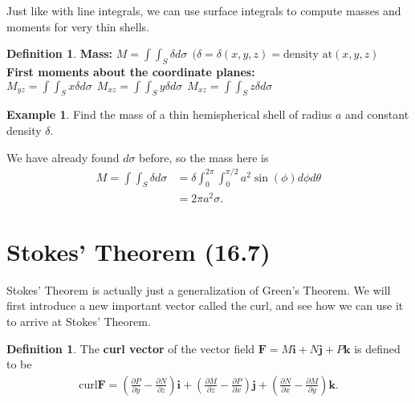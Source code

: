 \documentclass[12pt, letter]{article}
\theoremstyle{plain}
\numberwithin{theorem}{section}
\theoremstyle{definition}
\newtheorem{definition}[theorem]{Definition}
\newtheorem{example}[theorem]{Example}
\begin{document}
\bigskip

\hrulefill

\bigskip

Just like with line integrals, we can use surface integrals to compute masses and moments for very thin shells.

\bigskip

\begin{definition}
\textbf{Mass:} $M = \int\int_S \delta d\sigma \ \ (\delta = \delta(x,y,z) = \text{density at} (x,y,z)$\\
\textbf{First moments about the coordinate planes:}\\
$M_{yz} = \int\int_S x\delta d\sigma \ \ M_{xz} = \int\int_S y\delta d\sigma \ \ M_{xz} = \int\int_S z\delta d\sigma$
\end{definition}

\bigskip

\hrulefill

\bigskip

\begin{example}
Find the mass of a thin hemispherical shell of radius $a$ and constant density $\delta$.

\bigskip

We have already found $d\sigma$ before, so the mass here is
\begin{align*}
M=\int\int_S \delta d\sigma &= \delta \int_0^{2\pi} \int_0^{\pi/2} a^2\sin(\phi)d\phi d\theta\\
&= 2\pi a^2\sigma.
\end{align*}
\end{example}

\newpage


\section{Stokes' Theorem (16.7)}

Stokes' Theorem is actually just a generalization of Green's Theorem. We will first introduce a new important vector called the curl, and see how we can use it to arrive at Stokes' Theorem.

\bigskip

\begin{definition}
The \textbf{curl vector} of the vector field $\bm{F} = M\bm{i}+N\bm{j}+P\bm{k}$ is defined to be
\begin{align*}
\text{curl}\bm{F} = \left(\frac{\partial P}{\partial y}-\frac{\partial N}{\partial z}\right)\bm{i}+\left(\frac{\partial M}{\partial z}-\frac{\partial P}{\partial x}\right)\bm{j}+\left(\frac{\partial N}{\partial x}-\frac{\partial M}{\partial y}\right)\bm{k}.
\end{align*}
\end{definition}
\end{document}
